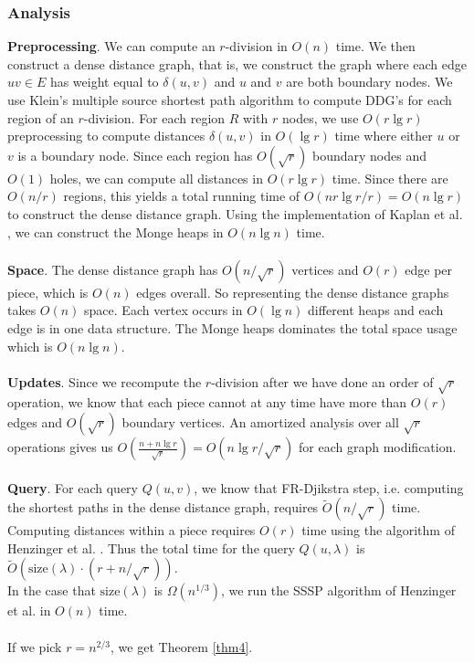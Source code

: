 \subsubsection{Analysis}
\textbf{Preprocessing}.
We can compute an $r$-division in $O(n)$
time. We then
construct a dense distance graph, that is, we construct the graph where each edge $uv\in
E$ has weight equal to $\delta(u,v)$ and $u$ and $v$ are both boundary nodes. We use
Klein's multiple source shortest path algorithm \cite{klein2005multiple} to compute DDG's
for each region of an $r$-division. For each region $R$ with $r$ nodes, we use $O(r\lg
r)$ preprocessing to compute distances $\delta(u,v)$ in $O(\lg r)$ time where either $u$
or $v$ is a boundary node. Since each region has $O(\sqrt{r})$ boundary nodes and $O(1)$
holes, we can compute all distances in $O(r\lg r)$ time. Since there are $O(n/r)$
regions, this yields a total running time of $O(nr\lg r/r)=O(n\lg r)$ to construct the
dense distance graph. Using the implementation of Kaplan et al.
\cite{kaplan2012submatrix}, we can construct the Monge heaps in $O(n\lg n)$ time.\\
\\
\textbf{Space}. The dense distance graph has $O(n/\sqrt{r})$ vertices and $O(r)$ edge
per piece, which is $O(n)$ edges overall. So representing the dense distance graphs takes
$O(n)$ space. Each vertex occurs in $O(\lg n)$ different heaps and each edge is in one
data structure. The Monge heaps dominates the total space usage which is $O(n\lg n)$. \\
\\
\textbf{Updates}.
 Since we recompute the $r$-division after we have
done an order of $\sqrt{r}$ operation, we know that each piece cannot at any time have
more than $O(r)$ edges and $O(\sqrt{r})$ boundary vertices. An amortized analysis over
all $\sqrt{r}$ operations gives us $O(\frac{n+n\lg r}{\sqrt{r}})=O(n\lg r/\sqrt{r})$ for
each graph modification. \\
\\
\textbf{Query}. For each query $Q(u,v)$, we know that FR-Djikstra step, i.e. computing
the shortest paths in the dense distance graph, requires $\tilde{O}(n/\sqrt{r})$ time.
Computing distances within a piece requires $O(r)$ time using the algorithm of Henzinger
et al. \cite{henzinger1997faster}. Thus the total time for the query $Q(u,\lambda)$ is
$\tilde{O}(\text{size}(\lambda)\cdot (r+n/\sqrt{r}))$. \\
In the case that $\text{size}(\lambda)$ is $\Omega(n^{1/3})$, we run the SSSP algorithm
of Henzinger et al. in $O(n)$ time. \\
\\
If we pick $r=n^{2/3}$, we get Theorem \ref{thm4}.

